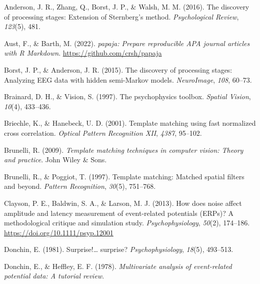 \documentclass[
  man]{apa7}
\newlength{\cslhangindent}
\newlength{\cslentryspacingunit} %
\newenvironment{CSLReferences}[2] %
 {%
  \setlength{\parindent}{0pt}
  \ifodd #1
  \let\oldpar\par
  \def\par{\hangindent=\cslhangindent\oldpar}
  \fi
  \setlength{\parskip}{#2\cslentryspacingunit}
 }%
 {}
\begin{document}
\hypertarget{refs}{}
\begin{CSLReferences}{1}{0}
\leavevmode{}%
Anderson, J. R., Zhang, Q., Borst, J. P., \& Walsh, M. M. (2016). The discovery of processing stages: {Extension} of {Sternberg}'s method. \emph{Psychological Review}, \emph{123}(5), 481.

\leavevmode{}%
Aust, F., \& Barth, M. (2022). \emph{{papaja}: {Prepare} reproducible {APA} journal articles with {R Markdown}}. \url{https://github.com/crsh/papaja}

\leavevmode{}%
Borst, J. P., \& Anderson, J. R. (2015). The discovery of processing stages: {Analyzing} {EEG} data with hidden semi-{Markov} models. \emph{NeuroImage}, \emph{108}, 60--73.

\leavevmode{}%
Brainard, D. H., \& Vision, S. (1997). The psychophysics toolbox. \emph{Spatial Vision}, \emph{10}(4), 433--436.

\leavevmode{}%
Briechle, K., \& Hanebeck, U. D. (2001). Template matching using fast normalized cross correlation. \emph{Optical Pattern Recognition {XII}}, \emph{4387}, 95--102.

\leavevmode{}%
Brunelli, R. (2009). \emph{Template matching techniques in computer vision: Theory and practice}. John Wiley \& Sons.

\leavevmode{}%
Brunelli, R., \& Poggiot, T. (1997). Template matching: {Matched} spatial filters and beyond. \emph{Pattern Recognition}, \emph{30}(5), 751--768.

\leavevmode{}%
Clayson, P. E., Baldwin, S. A., \& Larson, M. J. (2013). How does noise affect amplitude and latency measurement of event-related potentials ({ERPs})? {A} methodological critique and simulation study. \emph{Psychophysiology}, \emph{50}(2), 174--186. \url{https://doi.org/10.1111/psyp.12001}

\leavevmode{}%
Donchin, E. (1981). Surprise!\ldots{} surprise? \emph{Psychophysiology}, \emph{18}(5), 493--513.

\leavevmode{}%
Donchin, E., \& Heffley, E. F. (1978). \emph{Multivariate analysis of event-related potential data: {A} tutorial review}.


\end{CSLReferences}
\end{document}
